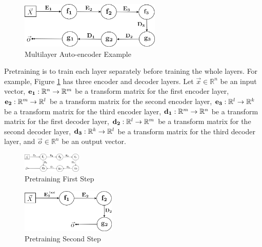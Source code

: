 \documentclass[draft,dvipsnames]{drexel-thesis}
\begin{document}
\begin{thesis}
\begin{figure}[t!]
    \centering
    \includegraphics[width=0.6\textwidth]{pictures/figures/example_MAE.png}
    \caption{Multilayer Auto-encoder Example}
    \label{fig:example_MAE}
\end{figure}

	Pretraining is to train each layer separately before training the whole layers. For example, Figure \ref{fig:example_MAE} has three encoder and decoder layers. Let $\vec{x} \in \mathbb{R}^n$ be an input vector, $\bold{e_1}: \mathbb{R}^n \rightarrow \mathbb{R}^m$ be a transform matrix for the first encoder layer, $\bold{e_2}: \mathbb{R}^m \rightarrow \mathbb{R}^l$ be a transform matrix for the second encoder layer, $\bold{e_3}: \mathbb{R}^l \rightarrow \mathbb{R}^k$ be a transform matrix for the third encoder layer, $\bold{d_1}: \mathbb{R}^m \rightarrow \mathbb{R}^n$ be a transform matrix for the first decoder layer, $\bold{d_2}: \mathbb{R}^l \rightarrow \mathbb{R}^m$ be a transform matrix for the second decoder layer, $\bold{d_3}: \mathbb{R}^k \rightarrow \mathbb{R}^l$ be a transform matrix for the third decoder layer, and $\vec{o} \in \mathbb{R}^n$ be an output vector.

\begin{figure}[t!]
    \centering
    \includegraphics[width=0.25\textwidth]{pictures/figures/train_MAE1.png}
    \caption{Pretraining First Step}
    \label{fig:train_MAE1}
\end{figure}

\begin{figure}[t!]
    \centering
    \includegraphics[width=0.4\textwidth]{pictures/figures/train_MAE2.png}
    \caption{Pretraining Second Step}
    \label{fig:train_MAE2}
\end{figure}


\end{thesis}
\end{document}
